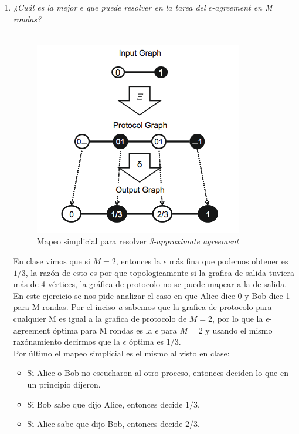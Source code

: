\documentclass{article}
\begin{document}
\begin{enumerate}
{\begin{enumerate}
      \item{\textsl{¿Cuál es la mejor $\epsilon$ que puede resolver en la tarea del 
            $\epsilon$-agreement en M rondas?}\\ \\
         
          \begin{figure}
            \centering
            \includegraphics[scale=0.65]{3b_agreement.png}
            \caption{Mapeo simplicial para resolver \textit{3-approximate agreement}}
          \end{figure}
          
          En clase vimos que si $M = 2$, entonces la $\epsilon$ más fina que podemos obtener es
          $1/3$, la razón de esto es por que topologicamente si la grafica de salida tuviera 
          más de 4 vértices, la gráfica de protocolo no se puede mapear a la de salida.\\
          En este ejercicio se nos pide analizar el caso en que Alice dice 0 y Bob dice 1 para M
          rondas. Por el inciso \textit{a} sabemos que la grafica de protocolo para cualquier
          M es igual a la grafica de protocolo de $M = 2$, por lo que la $\epsilon$-agreement 
          óptima para M rondas es la $\epsilon$ para $M = 2$ y usando el mismo razónamiento
          decirmos que la $\epsilon$ óptima es $1/3$.\\
          Por último el mapeo simplicial es el mismo al visto en clase: 
          
          \begin{itemize}
            \item{Si Alice o Bob no escucharon al otro proceso, entonces deciden lo que en un principio
              dijeron.}
            \item{Si Bob sabe que dijo Alice, entonces decide $1/3$.}
            \item{Si Alice sabe que dijo Bob, entonces decide $2/3$.}
          \end{itemize}

          
          
        }
        
      \end{enumerate}
    }
    
  \end{enumerate}
\end{document}
